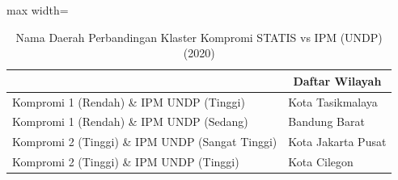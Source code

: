 \begin{table}[H]
\centering
\caption{Nama Daerah Perbandingan Klaster Kompromi STATIS vs IPM (UNDP) (2020)} \label{tab:sample1comp_ipm_name_2020}
\begin{adjustbox}{max width=\textwidth}
\begin{tabular}{|>{\centering\arraybackslash}p{4cm}|p{10cm}|}
\hline
\multicolumn{1}{|c|}{\textbf{Kategori}} & \multicolumn{1}{c|}{\textbf{Daftar Wilayah}} \\
\hline
Kompromi 1 (Rendah) \& IPM UNDP (Tinggi) & Kota Tasikmalaya \\
\hline
Kompromi 1 (Rendah) \& IPM UNDP (Sedang) & Bandung Barat \\
\hline
Kompromi 2 (Tinggi) \& IPM UNDP (Sangat Tinggi) & Kota Jakarta Pusat \\
\hline
Kompromi 2 (Tinggi) \& IPM UNDP (Tinggi) & Kota Cilegon \\
\hline
\end{tabular}
\end{adjustbox}
\end{table}